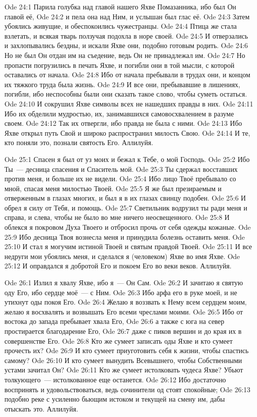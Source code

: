 \vs Ode 24:1
Парила голубка
над главой нашего Яхве Помазанника, ибо был Он главой её,
\vs Ode 24:2
и пела она над
Ним, и услышан был глас её.
\vs Ode 24:3
Затем убоялись
живущие, и обеспокоились чужестранцы.
\vs Ode 24:4
Птица же стала
взлетать, и всякая тварь ползучая подохла в норе своей.
\vs Ode 24:5
И отверзались
и захлопывались бездны, и искали Яхве они, подобно готовым родить.
\vs Ode 24:6
Но не был Он
отдан им на съедение, ведь Он не принадлежал им.
\vs Ode 24:7
Но пропасти
погрузились в печать Яхве, и погибли они в той мысли, с которой оставались от
начала.
\vs Ode 24:8
Ибо от начала
пребывали в трудах они, и концом их тяжкого труда была жизнь.
\vs Ode 24:9
И все они,
пребывавшие в лишениях, погибли, ибо неспособны были они сказать такое слово,
чтобы суметь остаться.
\vs Ode 24:10
И сокрушил
Яхве символы всех не нашедших правды в них.
\vs Ode 24:11
Ибо их
обделили мудростью, их, занимавшихся самовосхвалением в разуме своем.
\vs Ode 24:12
Так их
отвергли, ибо правда не была с ними.
\vs Ode 24:13
Ибо Яхве
открыл путь Свой и широко распространил милость Свою.
\vs Ode 24:14
И те, кто
поняли это, познали святость Его.
Аллилуйя.

\vs Ode 25:1
Спасен я был
от уз моих и бежал к Тебе, о мой Господь.
\vs Ode 25:2
Ибо Ты~---
десница спасения и Спаситель мой.
\vs Ode 25:3
Ты сдержал
восставших против меня, и больше их не видели.
\vs Ode 25:4
Ибо лицо Твоё
пребывало со мной, спасая меня милостью Твоей.
\vs Ode 25:5
Я же был
презираемым и отверженным в глазах многих, и был я в их глазах свинцу подобен.
\vs Ode 25:6
И обрел я силу
от Тебя, и помощь.
\vs Ode 25:7
Светильник
водрузил ты ради меня и справа, и слева, чтобы не было во мне ничего
неосвещенного.
\vs Ode 25:8
И облекся я
покровом Духа Твоего и отбросил прочь от себя одежды кожаные.
\vs Ode 25:9
Ибо десница
Твоя вознесла меня и принудила болезнь оставить меня.
\vs Ode 25:10
И стал я
могучим истиной Твоей и святым правдой Твоей.
\vs Ode 25:11
И все недруги
мои убоялись меня, и сделался я (человеком) Яхве во имя Яхве.
\vs Ode 25:12
И оправдался
я добротой Его и покоем Его во веки веков.
Аллилуйя.

\vs Ode 26:1
Излил я хвалу
Яхве, ибо я~--- Он Сам.
\vs Ode 26:2
И зачитаю я
святую оду Его, ибо сердце моё~--- с Ним.
\vs Ode 26:3
Ибо арфа его в
руке моей, и не утихнут оды покоя Его.
\vs Ode 26:4
Желаю я
воззвать к Нему всем сердцем моим, желаю я восхвалять и возвышать Его всеми
чреслами моими.
\vs Ode 26:5
Ибо от востока
до запада пребывает хвала Его,
\vs Ode 26:6
а также с юга
на север простирается благодарение Его,
\vs Ode 26:7
даже с пиков
вершин и до края их в совершенстве Его.
\vs Ode 26:8
Кто же сумеет
записать оды Яхве и кто сумеет прочесть их?
\vs Ode 26:9
И кто сумеет
приуготовить себя к жизни, чтобы спастись самому?
\vs Ode 26:10
И кто сумеет
вынудить Всевышнего, чтобы Собственными устами зачитал Он?
\vs Ode 26:11
Кто же сумеет
истолковать чудеса Яхве? Убьют толкующего~--- истолкованное еще останется.
\vs Ode 26:12
Ибо
достаточно воспринять и удовольствоваться, ведь сочинители од стоят спокойные;
\vs Ode 26:13
подобно реке
с усиленно бьющим истоком и текущей на смену им, дабы отыскать это.
Аллилуйя.


